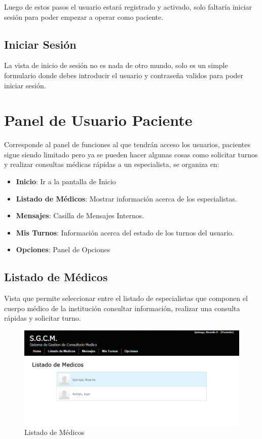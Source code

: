 Luego de estos pasos el usuario estará registrado y activado, solo faltaría iniciar sesión para poder empezar a operar como paciente.

\subsection{Iniciar Sesión}

La vista de inicio de sesión no es nada de otro mundo, solo es un simple formulario donde debes introducir el usuario y contraseña validos para poder iniciar sesión.


\section{Panel de Usuario Paciente}

Corresponde al panel de funciones al que tendrán acceso los usuarios, pacientes sigue siendo limitado pero ya se pueden hacer algunas cosas como solicitar turnos y realizar consultas médicas rápidas a un especialista, se organiza en:

\begin{itemize}
    \item \textbf{Inicio}: Ir a la pantalla de Inicio
    \item \textbf{Listado de Médicos}: Mostrar información  acerca de los especialistas.
    \item \textbf{Mensajes}: Casilla de Mensajes Internos.
    \item \textbf{Mis Turnos}: Información acerca del estado de los turnos del usuario.
    \item \textbf{Opciones}: Panel de Opciones
\end{itemize}


\subsection{Listado de Médicos}

Vista que permite seleccionar entre el listado de especialistas que componen el cuerpo médico de la institución consultar información, realizar una consulta rápidas y solicitar turno.

\begin{figure}[H]
    \centering
    \includegraphics[scale=0.5]{resourse/listado-medico.png}
    \caption{Listado de Médicos}
    \label{fig:67}
\end{figure}

